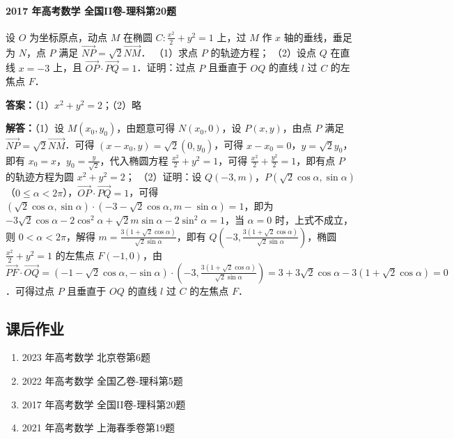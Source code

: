 \documentclass[UTF8,a4paper,11pt]{ctexart}
\begin{document}
\paragraph{2017 年高考数学 全国II卷-理科第20题}

设 $O$ 为坐标原点，动点 $M$ 在椭圆 $C:\frac{x^2}{2}+y^2=1$ 上，过 $M$ 作 $x$ 轴的垂线，垂足为 $N$，点 $P$ 满足 $\overrightarrow{NP}=\sqrt{2}\overrightarrow{NM}$．
（1）求点 $P$ 的轨迹方程；
（2）设点 $Q$ 在直线 $x=-3$ 上，且 $\overrightarrow{OP}\cdot\overrightarrow{PQ}=1$．证明：过点 $P$ 且垂直于 $OQ$ 的直线 $l$ 过 $C$ 的左焦点 $F$．

\textbf{答案：}（1）$x^2+y^2=2$；（2）略\par

\textbf{解答：}（1）设 $M(x_0,y_0)$，由题意可得 $N(x_0,0)$，设 $P(x,y)$，由点 $P$ 满足 $\overrightarrow{NP}=\sqrt{2}\overrightarrow{NM}$．可得 $(x-x_0,y)=\sqrt{2}(0,y_0)$，可得 $x-x_0=0$，$y=\sqrt{2}y_0$，即有 $x_0=x$，$y_0=\frac{y}{\sqrt{2}}$，代入椭圆方程 $\frac{x^2}{2}+y^2=1$，可得 $\frac{x^2}{2}+\frac{y^2}{2}=1$，即有点 $P$ 的轨迹方程为圆 $x^2+y^2=2$；
（2）证明：设 $Q(-3,m)$，$P(\sqrt{2}\cos\alpha,\sin\alpha)$（$0\le\alpha<2\pi$），$\overrightarrow{OP}\cdot\overrightarrow{PQ}=1$，可得 $(\sqrt{2}\cos\alpha,\sin\alpha)\cdot(-3-\sqrt{2}\cos\alpha,m-\sin\alpha)=1$，即为 $-3\sqrt{2}\cos\alpha-2\cos^2\alpha+\sqrt{2}m\sin\alpha-2\sin^2\alpha=1$，当 $\alpha=0$ 时，上式不成立，则 $0<\alpha<2\pi$，解得 $m=\frac{3(1+\sqrt{2}\cos\alpha)}{\sqrt{2}\sin\alpha}$，即有 $Q(-3,\frac{3(1+\sqrt{2}\cos\alpha)}{\sqrt{2}\sin\alpha})$，椭圆 $\frac{x^2}{2}+y^2=1$ 的左焦点 $F(-1,0)$，由 $\overrightarrow{PF}\cdot\overrightarrow{OQ}=(-1-\sqrt{2}\cos\alpha,-\sin\alpha)\cdot(-3,\frac{3(1+\sqrt{2}\cos\alpha)}{\sqrt{2}\sin\alpha})=3+3\sqrt{2}\cos\alpha-3(1+\sqrt{2}\cos\alpha)=0$．可得过点 $P$ 且垂直于 $OQ$ 的直线 $l$ 过 $C$ 的左焦点 $F$．

\subsection*{课后作业}

\begin{enumerate}

\item 2023 年高考数学 北京卷第6题

\item 2022 年高考数学 全国乙卷-理科第5题

\item 2017 年高考数学 全国II卷-理科第20题

\item 2021 年高考数学 上海春季卷第19题

\end{enumerate}
\end{document}
